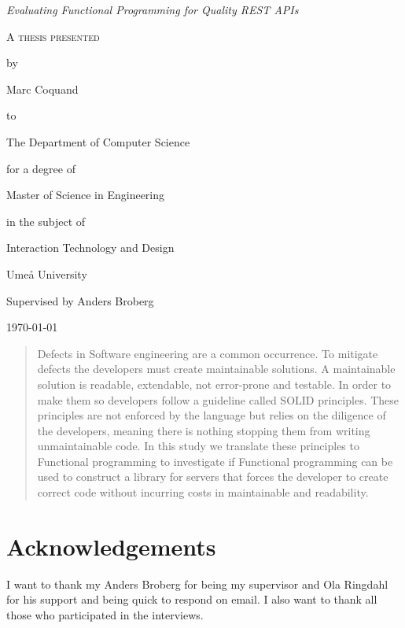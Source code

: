 \documentclass[12pt]{report}
\theoremstyle{definition}
\theoremstyle{theorem}
\begin{document}
\begin{titlepage}
	\centering
    \null
    \vfill
    {\Large\itshape Evaluating Functional Programming for Quality
    REST APIs    \par}
    \vspace{3.0cm}
	{\scshape 
    A thesis presented \par 
    by\par
	Marc Coquand\par
	to\par
    The Department of Computer Science\par
    \vspace{0.8cm}
	for a degree of\par
    Master of Science in Engineering\par
    in the subject of\par
    Interaction Technology and Design\par}
    \vfill
    Umeå University\par
    Supervised by Anders Broberg\par
	\today\par
\end{titlepage}
\clearpage
\thispagestyle{empty}

\clearpage\newpage
\thispagestyle{empty}

\begin{abstract} 
    Defects in Software engineering are a common occurrence. To mitigate defects
    the developers must create maintainable solutions. A maintainable solution
    is readable, extendable, not error-prone and testable. In order to make them
    so developers follow a guideline called SOLID principles.  These principles
    are not enforced by the language but relies on the diligence of the
    developers, meaning there is nothing stopping them from writing
    unmaintainable code. In this study we translate these principles to
    Functional programming to investigate if Functional programming can be used
    to construct a library for servers that forces the developer to create
    correct code without incurring costs in maintainable and readability.
\end{abstract}

\clearpage\newpage
\thispagestyle{empty}

\section*{Acknowledgements}

I want to thank my Anders Broberg for being my supervisor and Ola Ringdahl for
his support and being quick to respond on email. I also want to thank all those
who participated in the interviews.
\end{document}
